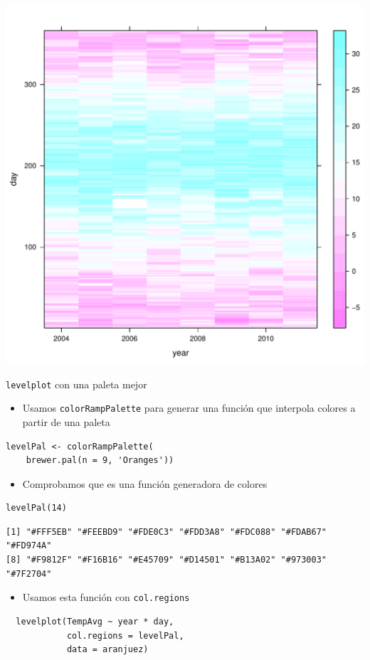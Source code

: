 \documentclass[xcolor={usenames,svgnames,dvipsnames}]{beamer}
\begin{document}
\begin{frame}[label=sec-2-1-35]{}
\includegraphics[width=.9\linewidth]{figs/levelplot.pdf}
\end{frame}

\begin{frame}[fragile,label=sec-2-1-36]{\texttt{levelplot} con una paleta mejor}
 \begin{itemize}
\item Usamos \texttt{colorRampPalette} para generar una función que interpola colores a partir de una paleta
\end{itemize}
\lstset{language=R,label= ,caption= ,numbers=none}
\begin{lstlisting}
levelPal <- colorRampPalette(
    brewer.pal(n = 9, 'Oranges'))
\end{lstlisting}
\begin{itemize}
\item Comprobamos que es una función generadora de colores
\end{itemize}

\lstset{language=R,label= ,caption= ,numbers=none}
\begin{lstlisting}
levelPal(14)
\end{lstlisting}

\begin{verbatim}
[1] "#FFF5EB" "#FEEBD9" "#FDE0C3" "#FDD3A8" "#FDC088" "#FDAB67" "#FD974A"
[8] "#F9812F" "#F16B16" "#E45709" "#D14501" "#B13A02" "#973003" "#7F2704"
\end{verbatim}

\begin{itemize}
\item Usamos esta función con \texttt{col.regions}
\end{itemize}
\lstset{language=R,label= ,caption= ,numbers=none}
\begin{lstlisting}
  levelplot(TempAvg ~ year * day,
            col.regions = levelPal,
            data = aranjuez)
\end{lstlisting}
\end{frame}
\end{document}
